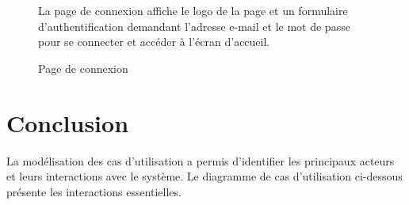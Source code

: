 \begin{figure}[ht]
  \centering
  \begin{minipage}{0.45\textwidth}
    \vspace{0.5cm}%
    La page de connexion affiche le logo de la page et un formulaire d'authentification demandant l'adresse e-mail et le mot de passe pour se connecter et accéder à l'écran d'accueil.
  \end{minipage}%
  \hspace{0.05\textwidth}%
  \begin{minipage}{0.5\textwidth}
    \centering
    \caption{Page de connexion}
    \label{fig:login_page}
  \end{minipage}
\end{figure}

\section{Conclusion}
La modélisation des cas d'utilisation a permis d'identifier les principaux acteurs et leurs interactions avec le système. Le diagramme de cas d'utilisation ci-dessous présente les interactions essentielles.